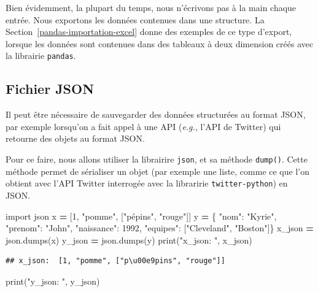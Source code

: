\documentclass[12pt,]{book}
\newenvironment{Shaded}{\begin{snugshade}}{\end{snugshade}}
\newcommand{\DecValTok}[1]{\textcolor[rgb]{0.00,0.00,0.81}{#1}}
\newcommand{\StringTok}[1]{\textcolor[rgb]{0.31,0.60,0.02}{#1}}
\newcommand{\ImportTok}[1]{#1}
\newcommand{\OperatorTok}[1]{\textcolor[rgb]{0.81,0.36,0.00}{\textbf{#1}}}
\newcommand{\BuiltInTok}[1]{#1}
\newcommand{\NormalTok}[1]{#1}
\numberwithin{equation}{section}
\numberwithin{countremarque}{section}
\begin{document}
Bien évidemment, la plupart du temps, nous n'écrivons pas à la main
chaque entrée. Nous exportons les données contenues dans une structure.
La Section~\ref{pandas-importation-excel} donne des exemples de ce type
d'export, lorsque les données sont contenues dans des tableaux à deux
dimension créés avec la librairie \texttt{pandas}.

\subsection{Fichier JSON}\label{fichier-json-1}

Il peut être nécessaire de sauvegarder des données structurées au format
JSON, par exemple lorsqu'on a fait appel à une API (\emph{e.g.}, l'API
de Twitter) qui retourne des objets au format JSON.

Pour ce faire, nous allons utiliser la librairire \texttt{json}, et sa
méthode \texttt{dump()}. Cette méthode permet de sérialiser un objet
(par exemple une liste, comme ce que l'on obtient avec l'API Twitter
interrogée avec la libraririe \texttt{twitter-python}) en JSON.

\begin{Shaded}
\begin{Highlighting}[]
\ImportTok{import}\NormalTok{ json}
\NormalTok{x }\OperatorTok{=}\NormalTok{ [}\DecValTok{1}\NormalTok{, }\StringTok{"pomme"}\NormalTok{, [}\StringTok{"pépins"}\NormalTok{, }\StringTok{"rouge"}\NormalTok{]]}
\NormalTok{y }\OperatorTok{=}\NormalTok{ \{ }\StringTok{"nom"}\NormalTok{: }\StringTok{"Kyrie"}\NormalTok{,}
  \StringTok{"prenom"}\NormalTok{: }\StringTok{"John"}\NormalTok{,}
  \StringTok{"naissance"}\NormalTok{: }\DecValTok{1992}\NormalTok{,}
  \StringTok{"equipes"}\NormalTok{: [}\StringTok{"Cleveland"}\NormalTok{, }\StringTok{"Boston"}\NormalTok{]\}}
\NormalTok{x_json }\OperatorTok{=}\NormalTok{ json.dumps(x)}
\NormalTok{y_json }\OperatorTok{=}\NormalTok{ json.dumps(y)}
\BuiltInTok{print}\NormalTok{(}\StringTok{"x_json: "}\NormalTok{, x_json)}
\end{Highlighting}
\end{Shaded}

\begin{lstlisting}
## x_json:  [1, "pomme", ["p\u00e9pins", "rouge"]]
\end{lstlisting}

\begin{Shaded}
\begin{Highlighting}[]
\BuiltInTok{print}\NormalTok{(}\StringTok{"y_json: "}\NormalTok{, y_json)}
\end{Highlighting}
\end{Shaded}
\end{document}
